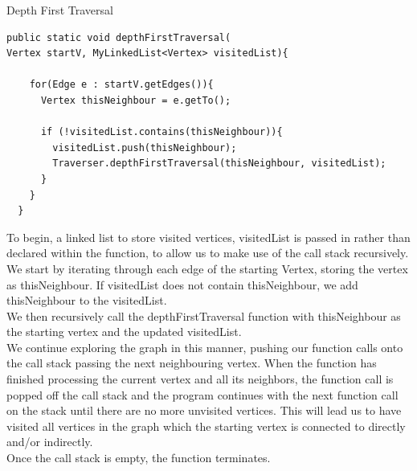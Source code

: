 \documentclass[a4paper]{article}
\begin{document}
\newpage

 


\begin{algorithm}
\caption{Depth First Traversal}\label{euclid}

\begin{verbatim}
public static void depthFirstTraversal(
Vertex startV, MyLinkedList<Vertex> visitedList){

    for(Edge e : startV.getEdges()){
      Vertex thisNeighbour = e.getTo();

      if (!visitedList.contains(thisNeighbour)){
        visitedList.push(thisNeighbour);
        Traverser.depthFirstTraversal(thisNeighbour, visitedList);
      }
    }
  }
\end{verbatim}
\end{algorithm}


\vspace{12mm}







To begin, a linked list to store visited vertices, visitedList 
is passed in rather than declared within the function,
to allow us to make use of the call stack recursively. \\

We start by iterating through each edge of the starting Vertex,
storing the vertex as thisNeighbour. 
If visitedList does not contain thisNeighbour,
we add thisNeighbour to the visitedList. \\

We then recursively call the depthFirstTraversal function with thisNeighbour as 
the starting vertex and the updated visitedList. \\

We continue exploring the graph in this manner, 
pushing our function calls onto the call stack passing the next neighbouring vertex.
When the function has finished processing the current vertex and all its neighbors, 
the function call is popped off the call stack and the program continues with the next function call on the stack
until there are no more unvisited vertices.
This will lead us to have visited all vertices in the graph which the starting vertex is connected to directly and/or indirectly.\\
Once the call stack is empty, the function terminates. \\
\newpage
\end{document}
